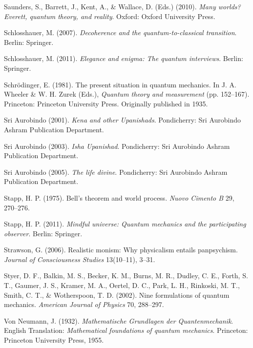 \begin{thebibliography}{99}
Saunders, S., Barrett, J., Kent, A., \& Wallace, D. (Eds.) (2010). \emph{Many worlds? Everett, quantum theory, and reality}. Oxford: Oxford University Press.

Schlosshauer, M. (2007). \emph{Decoherence and the quantum-to-classical transition}. Berlin: Springer. 

Schlosshauer, M. (2011). \emph{Elegance and enigma: The quantum interviews}. Berlin: Springer. 

Schr\"odinger, E. (1981). The present situation in quantum mechanics. In J. A. Wheeler \& W. H. Zurek (Eds.), \emph{Quantum theory and measurement} (pp. 152--167). Princeton: Princeton University Press. Originally published in 1935. 

Sri Aurobindo (2001). \emph{Kena and other Upanishads}. Pondicherry: Sri Aurobindo Ashram Publication Department. 

Sri Aurobindo (2003). \emph{Isha Upanishad}. Pondicherry: Sri Aurobindo Ashram Publication Department. 

Sri Aurobindo (2005). \emph{The life divine}. Pondicherry: Sri Aurobindo Ashram Publication Department. 

Stapp, H. P. (1975). Bell's theorem and world process. \emph{Nuovo Cimento B} 29, 270--276. 

Stapp, H. P. (2011). \emph{Mindful universe: Quantum mechanics and the participating observer}. Berlin: Springer. 

Strawson, G. (2006). Realistic monism: Why physicalism entails panpsychism. \emph{Journal of Consciousness Studies} 13(10--11), 3--31. 

Styer, D. F., Balkin, M. S., Becker, K. M., Burns, M. R., Dudley, C. E., Forth, S. T., Gaumer, J. S., Kramer, M. A., Oertel, D. C., Park, L. H., Rinkoski, M. T., Smith, C. T., \& Wotherspoon, T. D. (2002). Nine formulations of quantum mechanics. \emph{American Journal of Physics} 70, 288--297.
  
Von Neumann, J. (1932). \emph{Mathematische Grundlagen der Quantenmechanik}. English Translation: \emph{Mathematical foundations of quantum mechanics}. Princeton: Princeton University Press, 1955.


\end{thebibliography}
